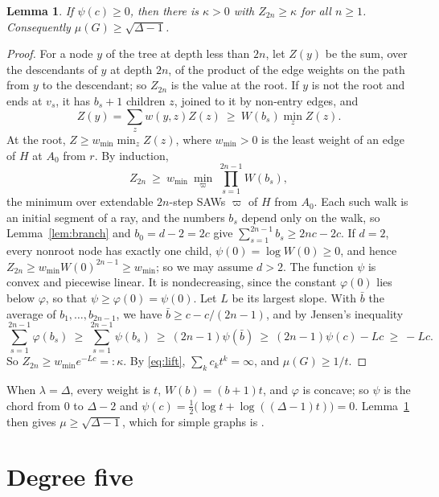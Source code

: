 \documentclass[11pt]{amsart}
\newtheorem{lemma}[theorem]{Lemma}
\theoremstyle{remark}
\begin{document}
\begin{lemma}\label{lem:weighted}
If $\psi(c)\ge0$, then there is $\kappa>0$ with $Z_{2n}\ge\kappa$ for all $n\ge1$. Consequently
$\mu(G)\ge\sqrt{\Delta-1}$.
\end{lemma}

\begin{proof}
For a node $y$ of the tree at depth less than $2n$, let $Z(y)$ be the sum, over the descendants of $y$ at depth $2n$,
of the product of the edge weights on the path from $y$ to the descendant; so $Z_{2n}$ is the value at the root. If
$y$ is not the root and ends at $v_s$, it has $b_s+1$ children $z$, joined to it by non-entry edges, and
\[
Z(y)=\sum_zw(y,z)Z(z)\ \ge\ W(b_s)\min_zZ(z).
\]
At the root, $Z\ge w_{\min}\min_zZ(z)$, where $w_{\min}>0$ is the least weight of an edge of $H$ at $A_0$ from $r$. By
induction,
\[
Z_{2n}\ \ge\ w_{\min}\ \min_\varpi\ \prod_{s=1}^{2n-1}W(b_s),
\]
the minimum over extendable $2n$-step SAWs $\varpi$ of $H$ from $A_0$. Each such walk is an initial segment of a ray,
and the numbers $b_s$ depend only on the walk, so Lemma~\ref{lem:branch} and $b_0=d-2=2c$ give
$\sum_{s=1}^{2n-1}b_s\ge2nc-2c$. If $d=2$, every nonroot node has exactly one child, $\psi(0)=\log W(0)\ge0$, and
hence $Z_{2n}\ge w_{\min}W(0)^{2n-1}\ge w_{\min}$; so we may assume $d>2$. The function $\psi$ is convex and piecewise linear. It is nondecreasing, since the
constant $\varphi(0)$ lies below $\varphi$, so that $\psi\ge\varphi(0)=\psi(0)$. Let $L$ be its largest slope. With
$\bar b$ the average of $b_1,\dots,b_{2n-1}$, we have $\bar b\ge c-c/(2n-1)$, and by Jensen's inequality
\[
\sum_{s=1}^{2n-1}\varphi(b_s)\ \ge\ \sum_{s=1}^{2n-1}\psi(b_s)\ \ge\ (2n-1)\psi(\bar b)\ \ge\
(2n-1)\psi(c)-Lc\ \ge\ -Lc.
\]
So $Z_{2n}\ge w_{\min}e^{-Lc}=:\kappa$. By \eqref{eq:lift}, $\sum_kc_kt^k=\infty$, and $\mu(G)\ge1/t$.
\end{proof}

When $\lambda=\Delta$, every weight is $t$, $W(b)=(b+1)t$, and $\varphi$ is concave; so $\psi$ is the chord from $0$
to $\Delta-2$ and $\psi(c)=\tfrac12\bigl(\log t+\log((\Delta-1)t)\bigr)=0$. Lemma~\ref{lem:weighted} then gives
$\mu\ge\sqrt{\Delta-1}$, which for simple graphs is \cite[Theorem~4.1(a)]{GL15}.

\section{Degree five}\label{sec:five}
\end{document}
